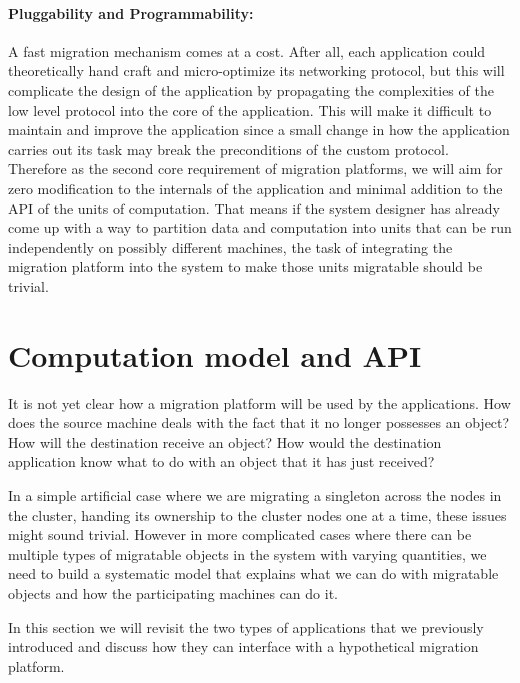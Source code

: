 \paragraph{Pluggability and Programmability:}
A fast migration mechanism comes at a cost. After all, each application
could theoretically hand craft and micro-optimize its networking protocol,
but this will complicate the design of the application by propagating
the complexities of the low level protocol into the core of the
application. This will make it difficult to maintain and improve the
application since a small change in how the application carries out its
task may break the preconditions of the custom protocol. Therefore as the
second core requirement of migration platforms, 
we will aim for zero modification to the
internals of the application and minimal addition to the API of the
units of computation. That means if
the system designer has already come up with a way to partition
data and computation into units that can be run independently on
possibly different machines, the task of integrating the migration
platform into the system to make those units migratable should be trivial.



\section{Computation model and API}
\label{sec:api}
It is not yet clear how a migration platform will be used by the
applications. How does the source machine deals with the fact that it
no longer possesses an object? How will the destination receive an object?
How would the destination application know what to do with an object
that it has just received?

In a simple artificial case where we are migrating a singleton across
the nodes in the cluster, handing its ownership to the cluster nodes one
at a time, these issues might sound trivial. However in more complicated
cases where there can be multiple types of migratable objects in the
system with varying quantities, we need to build a systematic model that
explains what we can do with migratable objects and how the participating
machines can do it.

In this section we will revisit the two types of applications that
we previously introduced and discuss how they can interface with a
hypothetical migration platform.

